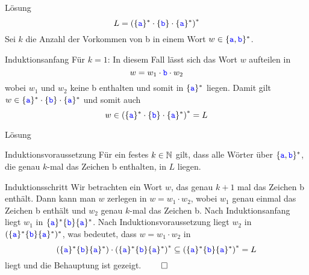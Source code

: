 \begin{frame}{Lösung}
	$$L = \left(\{\word a\}^\ast \cdot \{\word b\} \cdot \{\word a\}^\ast \right)^\ast$$
	Sei $k$ die Anzahl der Vorkommen von \word b in einem Wort $w \in \{\word a, \word b\}^\ast$.
	\begin{block}{Induktionsanfang}  \pause
		Für $k = 1$: In diesem Fall lässt sich das Wort $w$ aufteilen in $$w = w_1 \cdot \word b \cdot w_2$$ wobei $w_1$ und $w_2$ keine \word b enthalten und somit in $\{\word a\}^\ast$ liegen. Damit gilt $w \in \{\word a\}^\ast \cdot \{\word b\} \cdot \{\word a\}^\ast$ und somit auch $$w \in \left(\{\word a\}^\ast \cdot \{\word b\} \cdot \{\word a\}^\ast \right)^\ast = L$$
	\end{block}
\end{frame}

\begin{frame}{Lösung}
	\begin{block}{Induktionsvoraussetzung}  \pause
		Für ein festes $k \in \N$ gilt, dass alle Wörter über $\{\word a, \word b\}^\ast$, die genau $k$-mal das Zeichen \word b enthalten, in $L$ liegen.
	\end{block} \pause
	\begin{block}{Induktionsschritt}  \pause
		Wir betrachten ein Wort $w$, das genau $k + 1$ mal das Zeichen \word b enthält. Dann kann man $w$ zerlegen in $w = w_1 \cdot w_2$, wobei $w_1$ genau einmal das Zeichen \word b enthält und $w_2$ genau $k$-mal das Zeichen \word b. \pause Nach Induktionsanfang liegt $w_1$ in $\{\word a\}^\ast \{\word b\}\{\word a\}^\ast$. Nach Induktionsvoraussetzung liegt $w_2$ in $(\{\word a\}^\ast \{\word b\}\{\word a\}^\ast )^\ast$, was bedeutet, dass $w = w_1 \cdot w_2$ in $$\left(\{\word a\}^\ast \{\word b\}\{\word a\}^\ast \right) \· \left(\{\word a\}^\ast \{\word b\}\{\word a\}^\ast \right)^\ast \subseteq \left(\{\word a\}^\ast \{\word b\}\{\word a\}^\ast \right)^\ast = L$$ liegt und die Behauptung ist gezeigt. $\qed$
	\end{block}
\end{frame}

